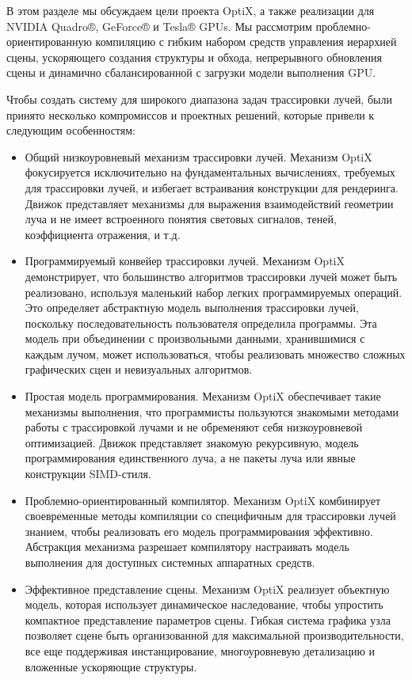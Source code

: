 В этом разделе мы обсуждаем цели проекта OptiX, а также реализации для NVIDIA Quadro®, GeForce® и Tesla® GPUs. 
Мы рассмотрим проблемно-ориентированную компиляцию с гибким набором средств управления иерархией сцены, ускоряющего создания структуры и обхода, непрерывного обновления сцены и динамично сбалансированной с загрузки модели выполнения GPU. 

Чтобы создать систему для широкого диапазона задач трассировки лучей, были принято несколько компромиссов и проектных решений, которые привели к следующим особенностям:
\begin{itemize}
 \item Общий низкоуровневый механизм трассировки лучей. 
 Механизм OptiX фокусируется исключительно на фундаментальных вычислениях, требуемых для трассировки лучей, и избегает встраивания конструкции для рендеринга. 
 Движок представляет механизмы для выражения взаимодействий геометрии луча и не имеет встроенного понятия световых сигналов, теней, коэффициента отражения, и т.д.

\item Программируемый конвейер трассировки лучей. 
Механизм OptiX демонстрирует, что большинство алгоритмов трассировки лучей может быть реализовано, используя маленький набор легких программируемых операций. 
Это определяет абстрактную модель выполнения трассировки лучей, поскольку последовательность пользователя определила программы. 
Эта модель при объединении с произвольными данными, хранившимися с каждым лучом, может использоваться, чтобы реализовать множество сложных графических сцен и невизуальных алгоритмов.

\item Простая модель программирования. 
Механизм OptiX обеспечивает такие механизмы выполнения, что программисты пользуются знакомыми методами работы с трассировкой лучами и  не обременяют себя низкоуровневой оптимизацией. 
Движок представляет знакомую рекурсивную, модель программирования единственного луча, а не пакеты луча или явные конструкции SIMD-стиля. 

\item Проблемно-ориентированный компилятор. 
Механизм OptiX комбинирует своевременные методы компиляции со специфичным для трассировки лучей знанием, чтобы реализовать его модель программирования эффективно. 
Абстракция механизма разрешает компилятору настраивать модель выполнения для доступных системных аппаратных средств.

\item Эффективное представление сцены. 
Механизм OptiX реализует объектную модель, которая использует динамическое наследование, чтобы упростить компактное представление параметров сцены. 
Гибкая система графика узла позволяет сцене быть организованной для максимальной производительности, все еще поддерживая инстанцирование, многоуровневую детализацию и вложенные ускоряющие структуры.

\end{itemize}

